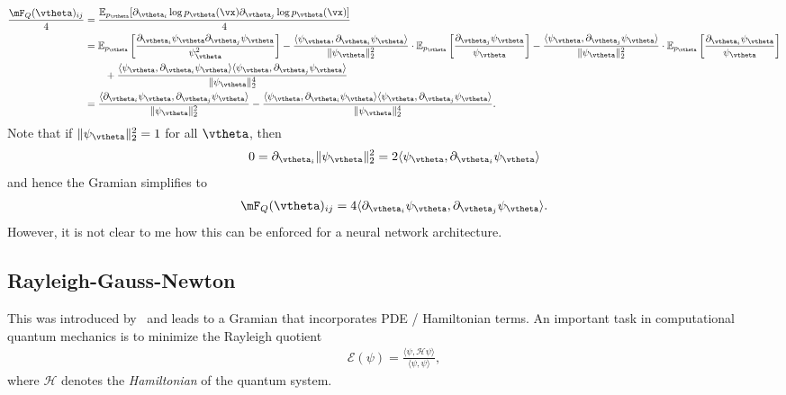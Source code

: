 \begin{align*}
    \frac{\mF_Q(\vtheta)_{ij}}{4} & = \frac{\mathbb E_{p_\vtheta}[\partial_{\vtheta_i} \log p_{\vtheta}(\vx)\partial_{\vtheta_j} \log p_{\vtheta}(\vx)]}{4}
    \\ & = \mathbb E_{p_\vtheta}\left[ \frac{\partial_{\vtheta_i} \psi_\vtheta \partial_{\vtheta_j} \psi_\vtheta}{\psi_\vtheta^2} \right] - \frac{\langle \psi_{\vtheta}, \partial_{\vtheta_i} \psi_\vtheta \rangle}{ \lVert \psi_\vtheta \rVert_2^2 } \cdot \mathbb E_{p_\vtheta} \left[ \frac{\partial_{\vtheta_j} \psi_\vtheta}{\psi_\vtheta} \right] - \frac{\langle \psi_{\vtheta}, \partial_{\vtheta_j} \psi_\vtheta \rangle}{ \lVert \psi_\vtheta \rVert_2^2 } \cdot \mathbb E_{p_\vtheta} \left[ \frac{\partial_{\vtheta_i} \psi_\vtheta}{\psi_\vtheta} \right]
    \\ & \qquad + \frac{\langle \psi_{\vtheta}, \partial_{\vtheta_i} \psi_\vtheta \rangle\langle \psi_{\vtheta}, \partial_{\vtheta_j} \psi_\vtheta \rangle}{\lVert \psi_\vtheta \rVert_2^4}
    \\ & = \frac{\langle \partial_{\vtheta_i} \psi_{\vtheta}, \partial_{\vtheta_j} \psi_\vtheta \rangle}{\lVert \psi_\vtheta \rVert_2^2} - \frac{\langle \psi_{\vtheta}, \partial_{\vtheta_i} \psi_\vtheta \rangle\langle \psi_{\vtheta}, \partial_{\vtheta_j} \psi_\vtheta \rangle}{\lVert \psi_\vtheta \rVert_2^4}.
\end{align*}
Note that if $\lVert \psi_\vtheta \rVert_2^2=1$ for all $\vtheta$, then
\begin{align}
    0 = \partial_{\vtheta_i} \lVert \psi_\vtheta \rVert_2^2 = 2\langle \psi_{\vtheta}, \partial_{\vtheta_i} \psi_\vtheta \rangle
\end{align}
and hence the Gramian simplifies to
\begin{align}
\mF_Q(\vtheta)_{ij} = 4\langle \partial_{\vtheta_i} \psi_{\vtheta}, \partial_{\vtheta_j} \psi_\vtheta \rangle.
\end{align}
However, it is not clear to me how this can be enforced for a neural network architecture.

\subsection{Rayleigh-Gauss-Newton}
This was introduced by~\cite{webber2022rayleigh} and leads to a Gramian that incorporates PDE / Hamiltonian terms.
An important task in computational quantum mechanics is to minimize the Rayleigh quotient
\begin{align}
    \mathcal E(\psi) = \frac{\langle \psi, \mathcal H \psi \rangle}{\langle \psi, \psi \rangle},
\end{align}
where $\mathcal H$ denotes the \emph{Hamiltonian} of the quantum system.


